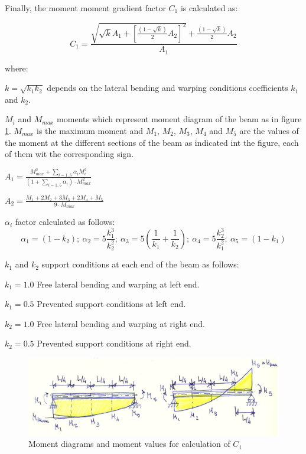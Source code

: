 Finally, the moment moment gradient factor $C_1$ is calculated as:

\begin{equation}
C_1= \frac{\sqrt{\sqrt{k} A_1+[\frac{(1-\sqrt{k})}{2} A_2]^2}+\frac{(1-\sqrt{k})}{2} A_2}{A_1}
\end{equation}

\noindent where:
\begin{description}
\item{$k= \sqrt{k_1 k_2}$} depends on the lateral bending and warping conditions coefficients $k_1$ and $k_2$.
\item{$M_i$ and $M_{max}$} moments which represent moment diagram of the beam as in figure \ref{fg_moment_diagrams}. $M_{max}$ is the maximum moment and $M_1$, $M_2$, $M_3$, $M_4$ and $M_5$ are the values of the moment at the different sections of the beam as indicated int the figure, each of them wit the corresponding sign.
\item{$A_1= \frac{M_{max}^2+\sum\limits_{i= 1..5} \alpha_i M_i^2}{(1+\sum\limits_{i= 1..5} \alpha_i) \cdot M_{max}^2}$}
\item{$A_2= \frac{M_1+2 M_2+ 3 M_3 + 2 M_4 + M_5}{9 \cdot M_{max}}$}
\item{$\alpha_i$} factor calculated as follows:
\begin{equation}
\alpha_1= (1-k_2);\ \alpha_2= 5 \frac{k_1^3}{k_2^2};\ \alpha_3= 5 (\frac{1}{k_1}+\frac{1}{k_2});\ \alpha_4= 5 \frac{k_2^3}{k_1^2};\ \alpha_5= (1-k_1)
\end{equation}
\item{$k_1$ and $k_2$} support conditions at each end of the beam as follows:
\begin{description}
\item{$k_1= 1.0$} Free lateral bending and warping at left end.
\item{$k_1= 0.5$} Prevented support conditions at left end.
\item{$k_2= 1.0$} Free lateral bending and warping at right end.
\item{$k_2= 0.5$} Prevented support conditions at right end.
\end{description}
\end{description}

\begin{figure}
\centering
\includegraphics[width=120mm]{materials/figures/ltb_moment_diagrams}
\caption{Moment diagrams and moment values for calculation of $C_1$}\label{fg_moment_diagrams}
\end{figure}

